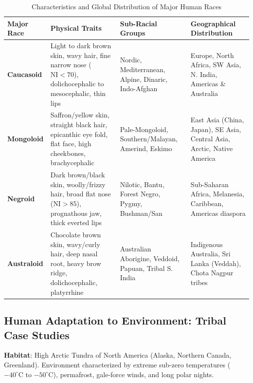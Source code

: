 \documentclass[11pt,a4paper]{article}
\begin{document}
\begin{table}[h!]
\centering
\small
\begin{tabularx}{\textwidth}{l X X X}
\toprule
\textbf{Major Race} & \textbf{Physical Traits} & \textbf{Sub-Racial Groups} & \textbf{Geographical Distribution} \\
\midrule
\textbf{Caucasoid} & Light to dark brown skin, wavy hair, fine narrow nose ($\text{NI}<70$), dolichocephalic to mesocephalic, thin lips & Nordic, Mediterranean, Alpine, Dinaric, Indo-Afghan & Europe, North Africa, SW Asia, N. India, Americas \& Australia \\
\midrule
\textbf{Mongoloid} & Saffron/yellow skin, straight black hair, epicanthic eye fold, flat face, high cheekbones, brachycephalic & Pale-Mongoloid, Southern/Malayan, Amerind, Eskimo & East Asia (China, Japan), SE Asia, Central Asia, Arctic, Native America \\
\midrule
\textbf{Negroid} & Dark brown/black skin, woolly/frizzy hair, broad flat nose ($\text{NI}>85$), prognathous jaw, thick everted lips & Nilotic, Bantu, Forest Negro, Pygmy, Bushman/San & Sub-Saharan Africa, Melanesia, Caribbean, Americas diaspora \\
\midrule
\textbf{Australoid} & Chocolate brown skin, wavy/curly hair, deep nasal root, heavy brow ridge, dolichocephalic, platyrrhine & Australian Aborigine, Veddoid, Papuan, Tribal S. India & Indigenous Australia, Sri Lanka (Veddah), Chota Nagpur tribes \\
\bottomrule
\end{tabularx}
\caption{Characteristics and Global Distribution of Major Human Races}
\end{table}

\newpage
\subsection{Human Adaptation to Environment: Tribal Case Studies}

\begin{casebox}
\textbf{Habitat}: High Arctic Tundra of North America (Alaska, Northern Canada, Greenland). Environment characterized by extreme sub-zero temperatures ($-40^\circ\text{C}$ to $-50^\circ\text{C}$), permafrost, gale-force winds, and long polar nights.
\end{casebox}
\end{document}
